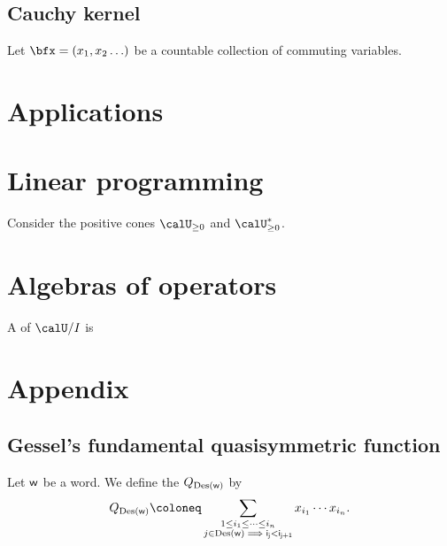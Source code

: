 \documentclass{article}
\newcommand*\Des{\operatorname{Des}}
\begin{document}
\subsection{Cauchy kernel}

\begin{definition}
    Let $\bfx = (x_1,x_2\ldots)$ be a countable collection of commuting variables.
\end{definition}

\section{Applications}

\section{Linear programming}

Consider the positive cones $\calU_{\geq 0}$ and $\calU^\ast_{\geq 0}$.


\section{Algebras of operators}

\begin{definition}
    A  of $\calU/I$ is
\end{definition}

\begin{definition}
\end{definition}


\section{Appendix}

\subsection{Gessel's fundamental quasisymmetric function}

\begin{definition}
    Let $\sf{w}$ be a word.
    We define the  $Q_{\Des(\sf w)}$ by
    \[
        Q_{\Des(\sf w)}
        \coloneq
        \sum_{
            \substack{
                1 \leq i_1 \leq \cdots \leq i_n \\
                j \in \Des(\sf w) \implies i_j < i_{j+1}
            }
        }
        x_{i_1} \cdots x_{i_n}.
    \]
\end{definition}
\end{document}
